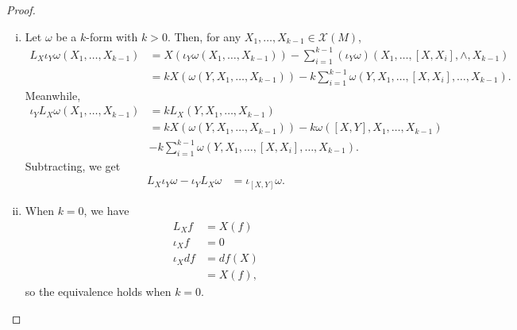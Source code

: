 \documentclass[10pt]{mypackage}
\begin{document}
\begin{proof}\hfill
  \begin{enumerate}[(i)]
    \item Let $\omega$ be a $k$-form with $k > 0$. Then, for any $X_1,\dots,X_{k-1}\in \mathcal{X}\left( M \right)$,
      \begin{align*}
        L_X\iota_Y\omega\left( X_1,\dots,X_{k-1} \right) &= X\left( \iota_Y\omega\left( X_1,\dots,X_{k-1} \right) \right) - \sum_{i=1}^{k-1} \left( \iota_Y\omega \right) \left( X_1,\dots,\left[ X,X_i \right],\wedge,X_{k-1} \right)\\
                                                                        &= kX\left( \omega\left( Y,X_1,\dots,X_{k-1} \right) \right) - k\sum_{i=1}^{k-1}\omega\left( Y,X_1,\dots,\left[ X,X_i \right],\dots,X_{k-1} \right).
      \end{align*}
      Meanwhile,
      \begin{align*}
        \iota_YL_X\omega\left( X_1,\dots,X_{k-1} \right) &= kL_{X}\left( Y,X_1,\dots,X_{k-1} \right)\\
                                                                        &= kX\left( \omega\left( Y,X_1,\dots,X_{k-1} \right) \right) - k\omega\left( \left[ X,Y \right],X_1,\dots,X_{k-1} \right)\\
                                                                        &- k\sum_{i=1}^{k-1} \omega\left( Y,X_1,\dots,\left[ X,X_i \right],\dots,X_{k-1} \right).
      \end{align*}
      Subtracting, we get
      \begin{align*}
        L_X\iota_Y\omega - \iota_YL_X\omega &= \iota_{\left[ X,Y \right]}\omega.
      \end{align*}
    \item When $k = 0$, we have
      \begin{align*}
        L_Xf &= X(f)\\
        \iota_Xf &= 0\\
        \iota_X df &= df\left( X \right)\\
                   &= X(f),
      \end{align*}
      so the equivalence holds when $k = 0$.\newline


\end{enumerate}
\end{proof}
\end{document}
